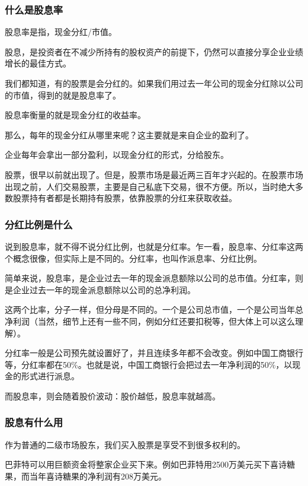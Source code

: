 \subsubsection{什么是股息率}

股息率是指，现金分红/市值。

股息，是投资者在不减少所持有的股权资产的前提下，仍然可以直接分享企业业绩增长的最佳方式。

我们都知道，有的股票是会分红的。如果我们用过去一年公司的现金分红除以公司的市值，得到的就是股息率了。

股息率衡量的就是现金分红的收益率。

那么，每年的现金分红从哪里来呢？这主要就是来自企业的盈利了。

企业每年会拿出一部分盈利，以现金分红的形式，分给股东。

股票，很早以前就出现了。但是，股票市场是最近两三百年才兴起的。在股票市场出现之前，人们交易股票，主要是自己私底下交易，很不方便。所以，当时绝大多数股票持有者都是长期持有股票，依靠股票的分红来获取收益。

\subsubsection{分红比例是什么}

说到股息率，就不得不说分红比例，也就是分红率。乍一看，股息率、分红率这两个概念很像，但实际上是不同的。分红率，也叫作派息率、分红比例。

简单来说，股息率，是企业过去一年的现金派息额除以公司的总市值。分红率，则是企业过去一年的现金派息额除以公司的总净利润。

这两个比率，分子一样，但分母是不同的。一个是公司总市值，一个是公司当年总净利润（当然，细节上还有一些不同，例如分红还要扣税等，但大体上可以这么理解）。

分红率一般是公司预先就设置好了，并且连续多年都不会改变。例如中国工商银行等，分红率都在50\%。也就是说，中国工商银行会把过去一年净利润的50\%，以现金的形式进行派息。

而股息率，则会随着股价波动：股价越低，股息率就越高。

\subsubsection{股息有什么用}

作为普通的二级市场股东，我们买入股票是享受不到很多权利的。

巴菲特可以用巨额资金将整家企业买下来。例如巴菲特用2500万美元买下喜诗糖果，而当年喜诗糖果的净利润有208万美元。

